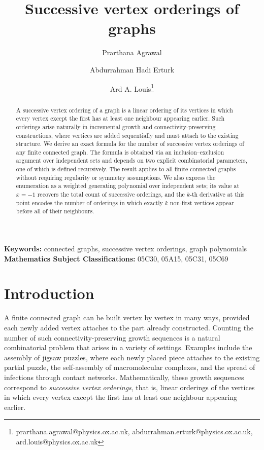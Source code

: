 \documentclass[11pt,a4paper]{article}
\title{Successive vertex orderings of graphs}
\author[]{Prarthana Agrawal}
\author[]{Abdurrahman Hadi Erturk}
\author[]{Ard A. Louis\thanks{prarthana.agrawal@physics.ox.ac.uk, abdurrahman.erturk@physics.ox.ac.uk, ard.louis@physics.ox.ac.uk}}
\affil[]{Rudolf Peierls Centre for Theoretical Physics\\
University of Oxford, United Kingdom OX1 3PU\\
}
\date{}
\numberwithin{equation}{section}
\theoremstyle{plain}
\theoremstyle{definition}
\theoremstyle{remark}
\begin{document}
\maketitle

\begin{abstract}
A successive vertex ordering of a graph is a linear ordering of its vertices in which every vertex except the first has at least one neighbour appearing earlier. Such orderings arise naturally in incremental growth and connectivity-preserving constructions, where vertices are added sequentially and must attach to the existing structure. We derive an exact formula for the number of successive vertex orderings of any finite connected graph. The formula is obtained via an inclusion--exclusion argument over independent sets and depends on two explicit combinatorial parameters, one of which is defined recursively. The result applies to all finite connected graphs without requiring regularity or symmetry assumptions. We also express the enumeration as a weighted generating polynomial over independent sets; its value at  $x = -1$ recovers the total count of successive orderings, and the $k$-th derivative at this point encodes the number of orderings in which exactly $k$ non-first vertices appear before all of their neighbours.
\end{abstract}

\noindent\textbf{Keywords:} connected graphs, successive vertex orderings, graph polynomials\\
\noindent\textbf{Mathematics Subject Classifications:} 05C30, 05A15, 05C31, 05C69

\section{Introduction}\label{sec:introduction}

A finite connected graph can be built vertex by vertex in many ways, provided each newly added vertex attaches to the part already constructed. Counting the number of such connectivity-preserving growth sequences is a natural combinatorial problem that arises in a variety of settings. Examples include the assembly of jigsaw puzzles, where each newly placed piece attaches to the existing partial puzzle, the self-assembly of macromolecular complexes, and the spread of infections through contact networks. Mathematically, these growth sequences correspond to \emph{successive vertex orderings}, that is, linear orderings of the vertices in which every vertex except the first has at least one neighbour appearing earlier.
\end{document}
